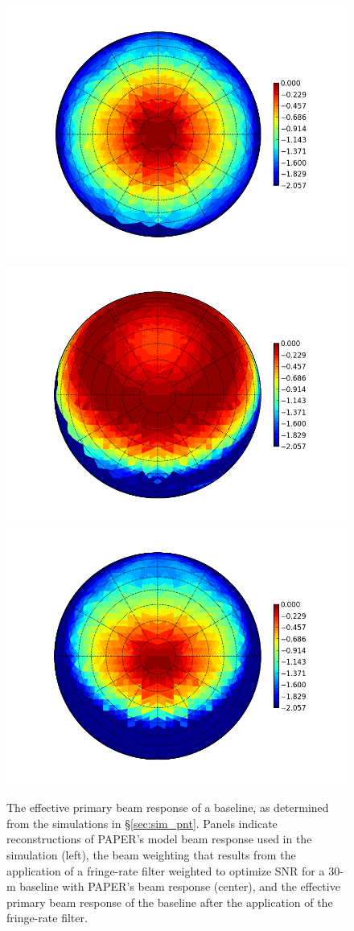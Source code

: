 \documentclass[twocolumn,apj,numberedappendix]{emulateapj}
\begin{document}
\begin{figure}\centering
\includegraphics[width=.6\columnwidth]{plots/beam_raw.png}
\includegraphics[width=.6\columnwidth]{plots/beam_wgt.png}
\includegraphics[width=.6\columnwidth]{plots/beam_fng.png}
\caption{
The effective primary beam response of a baseline, as determined from the simulations in \S\ref{sec:sim_pnt}.
Panels indicate reconstructions of PAPER's model beam response used in the simulation (left), the 
beam weighting that results from the application of a fringe-rate filter weighted to optimize SNR for
a 30-m baseline with PAPER's beam response (center), and the effective primary beam response of the
baseline after the application of the fringe-rate filter.
}\label{fig:}
\end{figure}
\end{document}
